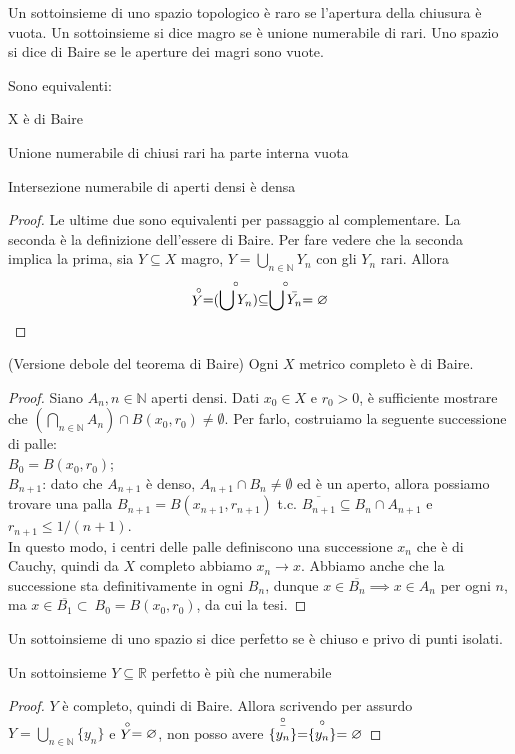 \begin{defn}
    Un sottoinsieme di uno spazio topologico \`e raro se l'apertura della chiusura \`e vuota. Un sottoinsieme si dice magro se \`e unione numerabile di rari. Uno spazio si dice di Baire se le aperture dei magri sono vuote.
\end{defn}
\begin{prop}
    Sono equivalenti:
    \begin{nlist}
        \item X \`e di Baire
        \item Unione numerabile di chiusi rari ha parte interna vuota
        \item Intersezione numerabile di aperti densi \`e densa
    \end{nlist}
\end{prop}
\begin{proof}
    Le ultime due sono equivalenti per passaggio al complementare. La seconda \`e la definizione dell'essere di Baire. Per fare vedere che la seconda implica la prima, sia $Y\subseteq X$ magro, $Y=\bigcup_{n\in\mathbb{N}}Y_n$ con gli $Y_n$ rari. Allora
    \[
    \stackrel{\circ}{Y}=\stackrel{\circ}{(\bigcup Y_n)}\subseteq\stackrel{\circ}{\bigcup \bar{Y_n}}=\varnothing
    \]
\end{proof}
\begin{thm}(Versione debole del teorema di Baire)
    Ogni $X$ metrico completo \`e di Baire.
\end{thm}
\begin{proof}
    Siano $A_n, n \in \mathbb{N}$ aperti densi. Dati $x_0 \in X$ e $r_0>0$, è sufficiente mostrare che $\displaystyle \left(\bigcap_{n \in \mathbb{N}} A_n \right)\cap B(x_0,r_0)\not=\emptyset$. Per farlo, costruiamo la seguente successione di palle: \\
    $B_0=B(x_0,r_0)$; \\
    $B_{n+1}$: dato che $A_{n+1}$ è denso, $A_{n+1}\cap B_n \not=\emptyset$ ed è un aperto, allora possiamo trovare una palla $B_{n+1}=B(x_{n+1},r_{n+1})$ t.c. $\overline{B_{n+1}} \subseteq B_n \cap A_{n+1}$ e $r_{n+1} \le 1/(n+1)$. \\
    In questo modo, i centri delle palle definiscono una successione $x_n$ che è di Cauchy, quindi da $X$ completo abbiamo $x_n \longrightarrow x$. Abbiamo anche che la successione sta definitivamente in ogni $B_n$, dunque $x \in \overline{B_n} \implies x \in A_n$ per ogni $n$, ma $x \in \overline{B_1} \subset\ B_0=B(x_0,r_0)$, da cui la tesi.
\end{proof}

\begin{defn}
    Un sottoinsieme di uno spazio si dice perfetto se \`e chiuso e privo di punti isolati.
\end{defn}
\begin{prop} Un sottoinsieme $Y\subseteq\mathbb{R}$ perfetto \`e pi\`u che numerabile
\end{prop}
\begin{proof}
    $Y$ \`e completo, quindi di Baire. Allora scrivendo per assurdo $Y=\bigcup_{n\in\mathbb{N}}\{y_n\}$ e $\stackrel{\circ}{Y}=\varnothing$, non posso avere $\stackrel{\circ}{\bar{\{y_n\}}}=\stackrel{\circ}{\{y_n\}}=\varnothing$
\end{proof}
